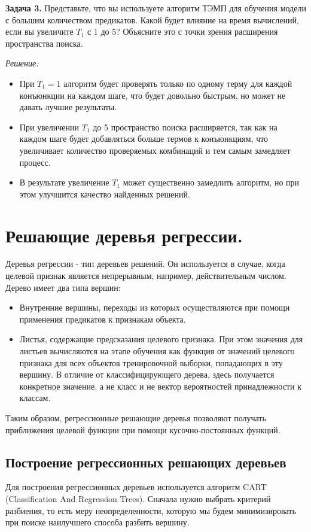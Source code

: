 \textbf{Задача 3.}
\newline
Представьте, что вы используете алгоритм ТЭМП для обучения модели с большим количеством предикатов. Какой будет влияние на время вычислений, если вы увеличите $T_1$ с 1 до 5? Объясните это с точки зрения расширения пространства поиска.

\textit{Решение:}
\begin{itemize}
    \item При $T_1 = 1$ алгоритм будет проверять только по одному терму для каждой конъюнкции на каждом шаге, что будет довольно быстрым, но может не давать лучшие результаты.
    \item При увеличении $T_1$ до 5 пространство поиска расширяется, так как на каждом шаге будет добавляться больше термов к конъюнкциям, что увеличивает количество проверяемых комбинаций и тем самым замедляет процесс.
    \item В результате увеличение $T_1$ может существенно замедлить алгоритм, но при этом улучшится качество найденных решений.
\end{itemize}


\section{Решающие деревья регрессии.}

Деревья регрессии - тип деревьев решений. Он используется в случае, когда целевой признак является непрерывным, например, действительным числом. Дерево имеет два типа вершин:
\begin{itemize}
    \item Внутренние вершины, переходы из которых осуществляются при помощи применения предикатов к признакам объекта.
    \item Листья, содержащие предсказания целевого признака. При этом значения для листьев вычисляются на этапе обучения как функция от значений целевого признака для всех объектов тренировочной выборки, попадающих в эту вершину. В отличие от классифицирующего дерева, здесь получается конкретное значение, а не класс и не вектор вероятностей принадлежности к классам.
\end{itemize}
Таким образом, регрессионные решающие деревья позволяют получать приближения целевой функции при помощи кусочно-постоянных функций.

\subsection{Построение регрессионных решающих деревьев}
Для построения регрессионных деревьев используется алгоритм CART (Classification And Regression Trees). Сначала нужно выбрать критерий разбиения, то есть меру неопределенности, которую мы будем минимизировать при поиске наилучшего способа разбить вершину.

